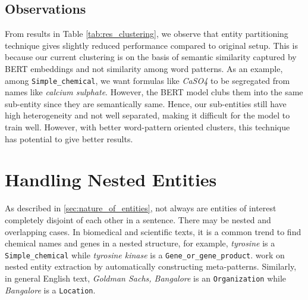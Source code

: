 \subsection{Observations}
From results in Table \ref{tab:res_clustering}, we observe that entity partitioning technique gives slightly reduced performance compared to original setup. This is because our current clustering is on the basis of semantic similarity captured by BERT embeddings and not similarity among word patterns. As an example, among \texttt{Simple\_chemical}, we want formulas like \textit{CaSO4} to be segregated from names like \textit{calcium sulphate}. However, the BERT model clubs them into the same sub-entity since they are semantically same. Hence, our sub-entities still have high heterogeneity and not well separated, making it difficult for the model to train well. However, with better word-pattern oriented clusters, this technique has potential to give better results.

\section{Handling Nested Entities}

As described in \ref{sec:nature_of_entities}, not always are entities of interest completely disjoint of each other in a sentence. There may be nested and overlapping cases. In biomedical and scientific texts, it is a common trend to find chemical names and genes in a nested structure, for example, \textit{tyrosine} is a \texttt{Simple\_chemical} while \textit{tyrosine kinase} is a \texttt{Gene\_or\_gene\_product}. \cite{wang2018penner} work on nested entity extraction by automatically constructing meta-patterns. Similarly, in general English text, \textit{Goldman Sachs, Bangalore} is an \texttt{Organization} while \textit{Bangalore} is a \texttt{Location}. 

